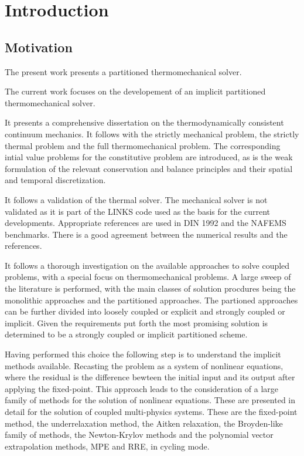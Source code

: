 \chapter{Introduction}

\section{Motivation}

The present work presents a partitioned thermomechanical solver.

The current work focuses on the developement of an implicit partitioned thermomechanical solver.

It presents a comprehensive dissertation on the thermodynamically consistent continuum mechanics.
It follows with the strictly mechanical problem, the strictly thermal problem and the full thermomechanical problem.
The corresponding intial value problems for the constitutive problem are introduced, as is the weak formulation of the relevant conservation and balance principles and their spatial and temporal discretization.

It follows a validation of the thermal solver.
The mechanical solver is not validated as it is part of the LINKS code used as the basis for the current developments.
Appropriate references are used in DIN 1992 and the NAFEMS benchmarks.
There is a good agreement between the numerical results and the references.

It follows a thorough investigation on the available approaches to solve coupled problems, with a special focus on thermomechanical problems.
A large sweep of the literature is performed, with the main classes of solution procdures being the monolithic approaches and the partitioned approaches.
The partioned approaches can be further divided into loosely coupled or explicit and strongly coupled or implicit.
Given the requirements put forth the most promising solution is determined to be a strongly coupled or implicit partitioned scheme.

Having performed this choice the following step is to understand the implicit methods available.
Recasting the problem as a system of nonlinear equations, where the residual is the difference bewteen the initial input and its output after applying the fixed-point.
This approach leads to the consideration of a large family of methods for the solution of nonlinear equations.
These are presented in detail for the solution of coupled multi-physics systems.
These are the fixed-point method, the underrelaxation method, the Aitken relaxation, the Broyden-like family of methods, the Newton-Krylov methods and the polynomial vector extrapolation methods, MPE and RRE, in cycling mode.

